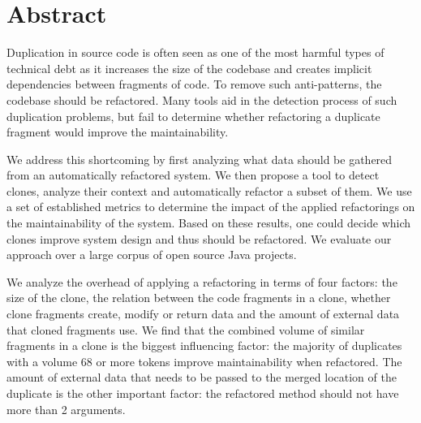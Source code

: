 \chapter*{Abstract}
Duplication in source code is often seen as one of the most harmful types of technical debt as it increases the size of the codebase and creates implicit dependencies between fragments of code. To remove such anti-patterns, the codebase should be refactored. Many tools aid in the detection process of such duplication problems, but fail to determine whether refactoring a duplicate fragment would improve the maintainability.

We address this shortcoming by first analyzing what data should be gathered from an automatically refactored system. We then propose a tool to detect clones, analyze their context and automatically refactor a subset of them. We use a set of established metrics to determine the impact of the applied refactorings on the maintainability of the system. Based on these results, one could decide which clones improve system design and thus should be refactored. We evaluate our approach over a large corpus of open source Java projects.

We analyze the overhead of applying a refactoring in terms of four factors: the size of the clone, the relation between the code fragments in a clone, whether clone fragments create, modify or return data and the amount of external data that cloned fragments use. We find that the combined volume of similar fragments in a clone is the biggest influencing factor: the majority of duplicates with a volume 68 or more tokens improve maintainability when refactored. The amount of external data that needs to be passed to the merged location of the duplicate is the other important factor: the refactored method should not have more than 2 arguments.
